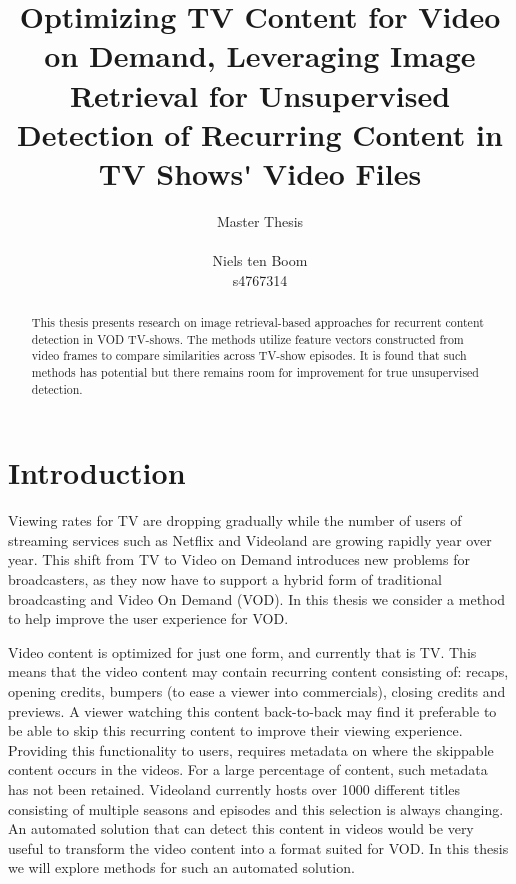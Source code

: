 \documentclass{article}
\begin{document}
\title{Optimizing TV Content for Video on Demand, Leveraging Image Retrieval for Unsupervised Detection of Recurring Content in TV Shows\'{} Video Files}
\author{Master Thesis\\ \\ Niels ten Boom  \\ s4767314}

\date{\vspace{-3ex}}

\maketitle
\newpage

\begin{abstract}
This thesis presents research on image retrieval-based approaches for recurrent content detection in VOD TV-shows. The methods utilize feature vectors
constructed from video frames to compare similarities across TV-show episodes. It is found that such methods has potential but there remains room for improvement for true unsupervised detection.
\end{abstract}
\newpage

\tableofcontents
\newpage

\section{Introduction} \label{introduction}
Viewing rates for TV are dropping gradually while the number of users of streaming services such as Netflix and Videoland are growing rapidly year over year. This shift from TV to Video on Demand introduces new problems for broadcasters, as they now have to support a hybrid form of traditional broadcasting and Video On Demand (VOD). In this thesis we consider a method to help improve the user experience for VOD.

Video content is optimized for just one form, and currently that is TV. This means that the video content may contain recurring content consisting of: recaps, opening credits, bumpers (to ease a viewer into commercials), closing credits and previews. A viewer watching this content back-to-back may find it preferable to be able to skip this recurring content to improve their viewing experience. Providing this functionality to users, requires metadata on where the skippable content occurs in the videos. For a large percentage of content, such metadata has not been retained. Videoland currently hosts over 1000 different titles consisting of multiple seasons and episodes and this selection is always changing. An automated solution that can detect this content in videos would be very useful to transform the video content into a format suited for VOD. In this thesis we will explore methods for such an automated solution.
\end{document}
